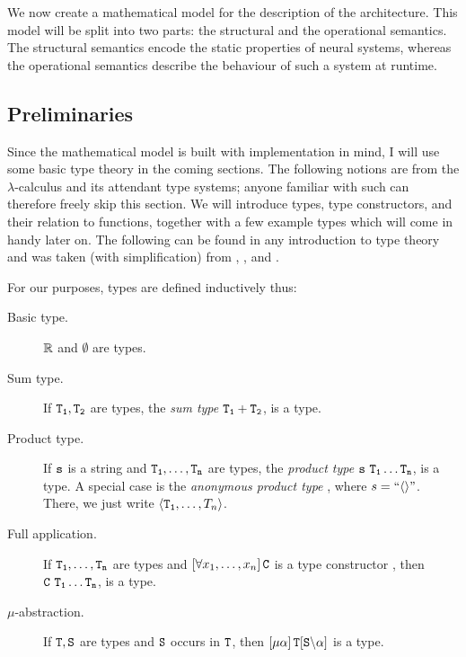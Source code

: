 We now create a mathematical model for the description of the architecture. This model will be split into two parts: the structural and the operational semantics. The structural semantics encode the static properties of neural systems, whereas the operational semantics describe the behaviour of such a system at runtime.

\subsection{Preliminaries}\label{sec:mathematicalPreliminaries}

Since the mathematical model is built with implementation in mind, I will use some basic type theory in the coming sections. The following notions are from the $\lambda$-calculus and its attendant type systems; anyone familiar with such can therefore freely skip this section. We will introduce types, type constructors, and their relation to functions, together with a few example types which will come in handy later on. The following can be found in any introduction to type theory and was taken (with simplification) from \cite{Mendler:1988:IDT:913822}, \cite{typeIntroduction2}, and \cite{Jacobs97atutorial}.

\begin{definition}\label{def:type}
For our purposes, types are defined inductively thus:
	\begin{description}
		\item[Basic type.] $\mathbb{R}$ and $\emptyset$ are types.
		\item[Sum type.] If $\mathtt{T_1},\mathtt{T_2}$ are types, the {\em sum type} $\mathtt{T_1 + T_2}$, is a type. 
		\item[Product type.] If $\mathtt{s}$ is a string and $\mathtt{T_1},\dots,\mathtt{T_n}$ are types, the {\em product type} $\type{s}\ \type{T_1} \dots \type{T_n}$, is a type. A special case is the {\em anonymous product type} , where $s=``\langle\rangle"$. There, we just write $\langle\mathtt{T_1},\dots,T_n \rangle$.
		\item[Full application.] If $\mathtt{T_1},\dots,\mathtt{T_n}$ are types and $\left[\forall x_1,\dots,x_n \right] \mathtt{C}$ is a type constructor , then $\mathtt{C\ T_1} \dots \mathtt{T_n}$, is a type.
		\item[$\mu$-abstraction.] If $\mathtt{T}, \mathtt{S}$ are types and $\mathtt{S}$ occurs in $\mathtt{T}$, then $\left[\mu \alpha \right]\mathtt{T}[\mathtt{S}\backslash\alpha]$  is a type.
	\end{description}
\end{definition}


